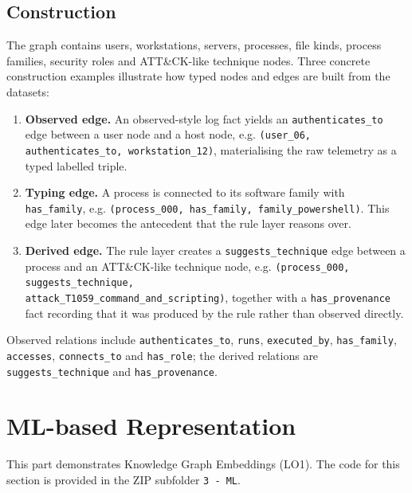 \documentclass{article}
\begin{document}
\subsection{Construction}
\label{sec:construction-detail}
The graph contains users, workstations, servers, processes, file kinds,
process families, security roles and ATT\&CK-like technique nodes. Three
concrete construction examples illustrate how typed nodes and edges are built
from the datasets:
\begin{enumerate}
    \item \textbf{Observed edge.} An observed-style log fact yields an
    \texttt{authenticates\_to} edge between a user node and a host node, e.g.
    \texttt{(user\_06, authenticates\_to, workstation\_12)}, materialising the
    raw telemetry as a typed labelled triple.
    \item \textbf{Typing edge.} A process is connected to its software family
    with \texttt{has\_family}, e.g.
    \texttt{(process\_000, has\_family, family\_powershell)}. This edge later
    becomes the antecedent that the rule layer reasons over.
    \item \textbf{Derived edge.} The rule layer creates a
    \texttt{suggests\_technique} edge between a process and an ATT\&CK-like
    technique node, e.g.
    \texttt{(process\_000, suggests\_technique,\\
    attack\_T1059\_command\_and\_scripting)},
    together with a \texttt{has\_provenance} fact recording that it was
    produced by the rule rather than observed directly.
\end{enumerate}
Observed relations include \texttt{authenticates\_to}, \texttt{runs},
\texttt{executed\_by}, \texttt{has\_family}, \texttt{accesses},
\texttt{connects\_to} and \texttt{has\_role}; the derived relations are
\texttt{suggests\_technique} and \texttt{has\_provenance}.

\section{ML-based Representation}
\label{sec:ml-representation}
This part demonstrates Knowledge Graph Embeddings (LO1). The code for this
section is provided in the ZIP subfolder \texttt{3 - ML}.
\end{document}

